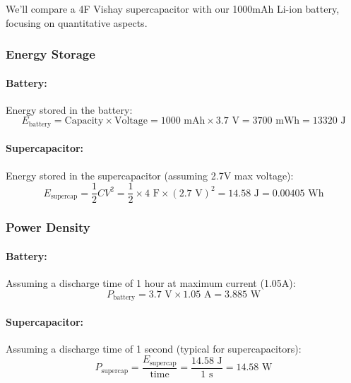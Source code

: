 \documentclass[a4paper,11pt]{article}%
\begin{document}
We'll compare a 4F Vishay supercapacitor with our 1000mAh Li-ion battery, focusing on quantitative aspects.

\subsubsection{Energy Storage}

\paragraph{Battery:}
Energy stored in the battery:
\begin{equation}
    E_{\text{battery}} = \text{Capacity} \times \text{Voltage} = 1000 \text{ mAh} \times 3.7 \text{ V} = 3700 \text{ mWh} = 13320 \text{ J}
\end{equation}

\paragraph{Supercapacitor:}
Energy stored in the supercapacitor (assuming 2.7V max voltage):
\begin{equation}
    E_{\text{supercap}} = \frac{1}{2} C V^2 = \frac{1}{2} \times 4 \text{ F} \times (2.7 \text{ V})^2 = 14.58 \text{ J} = 0.00405 \text{ Wh}
\end{equation}

\subsubsection{Power Density}

\paragraph{Battery:}
Assuming a discharge time of 1 hour at maximum current (1.05A):
\begin{equation}
    P_{\text{battery}} = 3.7 \text{ V} \times 1.05 \text{ A} = 3.885 \text{ W}
\end{equation}

\paragraph{Supercapacitor:}
Assuming a discharge time of 1 second (typical for supercapacitors):
\begin{equation}
    P_{\text{supercap}} = \frac{E_{\text{supercap}}}{\text{time}} = \frac{14.58 \text{ J}}{1 \text{ s}} = 14.58 \text{ W}
\end{equation}
\end{document}
